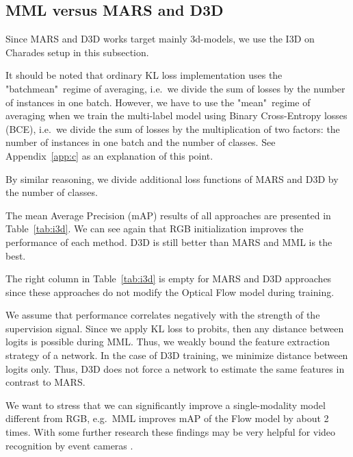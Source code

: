 \documentclass[conference]{IEEEtran}
\begin{document}
\subsection{MML versus MARS and D3D} \label{subsec:versus}

Since MARS \cite{Crasto_2019_CVPR} and D3D \cite{Stroud_2020_WACV} works target mainly 3d-models, we use the I3D on Charades setup in this subsection.

It should be noted that ordinary KL loss implementation uses the "batchmean"\ regime of averaging, i.e.~we divide the sum of losses by the number of instances in one batch. However, we have to use the "mean"\ regime of averaging when we train the multi-label model using Binary Cross-Entropy losses (BCE), i.e.~we divide the sum of losses by the multiplication of two factors: the number of instances in one batch and the number of classes. See Appendix~\ref{app:c} as an explanation of this point.

By similar reasoning, we divide additional loss functions of MARS and D3D by the number of classes.

The mean Average Precision (mAP) results of all approaches are presented in Table~\ref{tab:i3d}. We can see again that RGB initialization improves the performance of each method. D3D is still better than MARS and MML is the best.

The right column in Table~\ref{tab:i3d} is empty for MARS and D3D approaches since these approaches do not modify the Optical Flow model during training.

We assume that performance correlates negatively with the strength of the supervision signal. Since we apply KL loss to probits, then any  distance between logits is possible during MML. Thus, we weakly bound the feature extraction strategy of a network. In the case of D3D training, we minimize  distance between logits only. Thus, D3D does not force a network to estimate the same features in contrast to MARS.

We want to stress that we can significantly improve a single-modality model different from RGB, e.g.~MML improves mAP of the Flow model by about 2 times. With some further research these findings may be very helpful for video recognition by event cameras \cite{gehrig2020video}.
\end{document}
